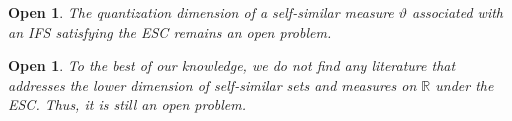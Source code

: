 \documentclass{amsproc}
\newtheorem{op}[theorem]{Open}
\theoremstyle{definition}
\theoremstyle{remark}
\numberwithin{equation}{section}
\begin{document}
\begin{op}
The quantization dimension of a self-similar measure $\vartheta$ associated with an IFS satisfying the ESC remains an open problem.
\end{op}
\begin{op}
    To the best of our knowledge, we do not find any literature that addresses the lower dimension of self-similar sets and measures on $\mathbb{R}$ under the ESC. Thus, it is still an open problem. 
\end{op}
   
\end{document}
